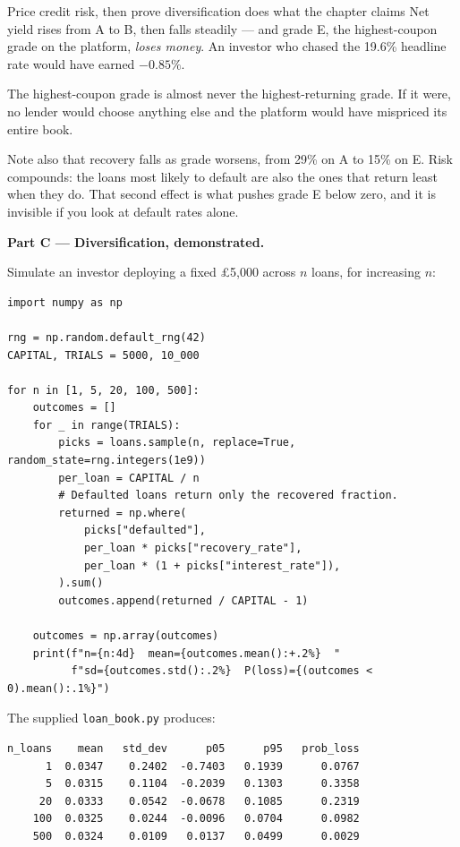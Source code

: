 \begin{labproject}{Price credit risk, then prove diversification does what the chapter claims}
Net yield rises from A to B, then falls steadily --- and grade E, the highest-coupon grade on the platform, \emph{loses money}. An investor who chased the 19.6\% headline rate would have earned $-0.85\%$.

\begin{keyidea}
The highest-coupon grade is almost never the highest-returning grade. If it were, no lender would choose anything else and the platform would have mispriced its entire book.

Note also that recovery falls as grade worsens, from 29\% on A to 15\% on E. Risk compounds: the loans most likely to default are also the ones that return least when they do. That second effect is what pushes grade E below zero, and it is invisible if you look at default rates alone.
\end{keyidea}

\medskip\noindent\textbf{Part C --- Diversification, demonstrated.}\par
Simulate an investor deploying a fixed \pounds5{,}000 across $n$ loans, for increasing $n$:

\begin{lstlisting}[style=mlpython]
import numpy as np

rng = np.random.default_rng(42)
CAPITAL, TRIALS = 5000, 10_000

for n in [1, 5, 20, 100, 500]:
    outcomes = []
    for _ in range(TRIALS):
        picks = loans.sample(n, replace=True, random_state=rng.integers(1e9))
        per_loan = CAPITAL / n
        # Defaulted loans return only the recovered fraction.
        returned = np.where(
            picks["defaulted"],
            per_loan * picks["recovery_rate"],
            per_loan * (1 + picks["interest_rate"]),
        ).sum()
        outcomes.append(returned / CAPITAL - 1)

    outcomes = np.array(outcomes)
    print(f"n={n:4d}  mean={outcomes.mean():+.2%}  "
          f"sd={outcomes.std():.2%}  P(loss)={(outcomes < 0).mean():.1%}")
\end{lstlisting}

The supplied \texttt{loan\_book.py} produces:

\begin{lstlisting}[style=mlterminal]
n_loans    mean   std_dev      p05      p95   prob_loss
      1  0.0347    0.2402  -0.7403   0.1939      0.0767
      5  0.0315    0.1104  -0.2039   0.1303      0.3358
     20  0.0333    0.0542  -0.0678   0.1085      0.2319
    100  0.0325    0.0244  -0.0096   0.0704      0.0982
    500  0.0324    0.0109   0.0137   0.0499      0.0029
\end{lstlisting}


\end{labproject}
